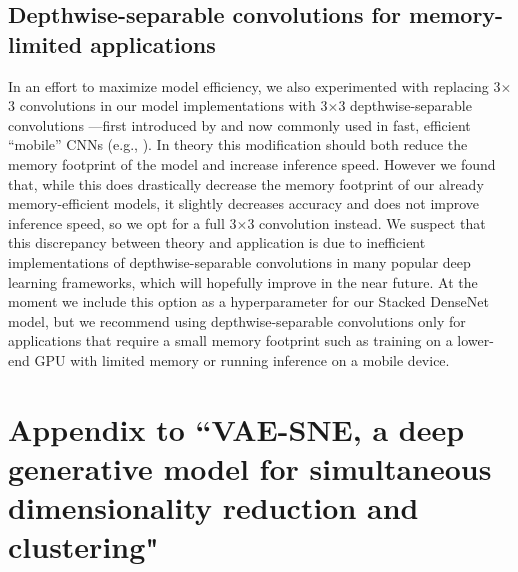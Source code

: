 \documentclass[11pt,a4paper,oneside]{book}
\begin{document}
\begin{doublespace}
\begin{appendices}
\section[Depthwise-separable convolutions]{Depthwise-separable convolutions for memory-limited applications}
In an effort to maximize model efficiency, we also experimented with replacing 3$\times$3 convolutions in our model implementations with 3$\times$3 depthwise-separable convolutions —first introduced by \cite{chollet2017xception} and now commonly used in fast, efficient “mobile” CNNs (e.g., \citealt{sandler2018mobilenetv2}). In theory this modification should both reduce the memory footprint of the model and increase inference speed. However we found that, while this does drastically decrease the memory footprint of our already memory-efficient models, it slightly decreases accuracy and does not improve inference speed, so we opt for a full 3$\times$3 convolution instead. We suspect that this discrepancy between theory and application is due to inefficient implementations of depthwise-separable convolutions in many popular deep learning frameworks, which will hopefully improve in the near future. At the moment we include this option as a hyperparameter for our Stacked DenseNet model, but we recommend using depthwise-separable convolutions only for applications that require a small memory footprint such as training on a lower-end GPU with limited memory or running inference on a mobile device.

\chapter[VAE-SNE]{Appendix to ``VAE-SNE, a deep generative model for simultaneous dimensionality reduction and clustering"}


\end{appendices}
\end{doublespace}
\end{document}
